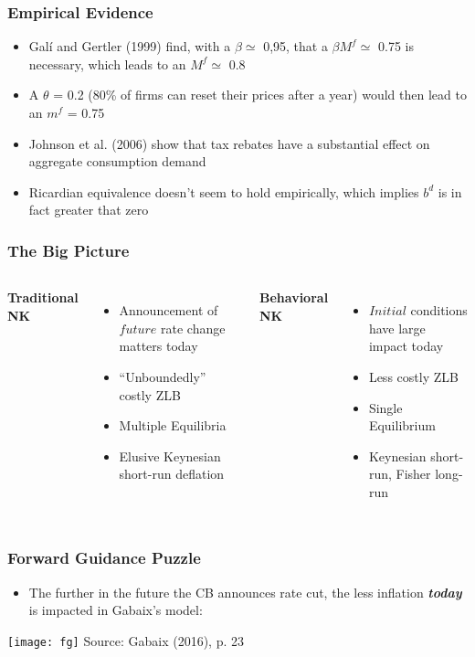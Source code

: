 \documentclass{beamer}
\begin{document}

\begin{frame}
\frametitle{Empirical Evidence}
\begin{itemize}
\item Gal\'{i} and Gertler (1999) find, with a $\beta \simeq$ 0,95, that a $\beta M^{f}\simeq$ 0.75 is necessary, which leads to an $M^{f}\simeq$ 0.8
\item A $\theta$ = 0.2 (80\% of firms can reset their prices after a year) would then lead to an ${m^{f}}$ = 0.75
\item Johnson et al. (2006) show that tax rebates have a substantial effect on aggregate consumption demand
\item Ricardian equivalence doesn't seem to hold empirically, which implies $b^{d}$ is in fact greater that zero  
\end{itemize}
\end{frame}


\begin{frame}
	\frametitle{The Big Picture}
	\begin{columns}[c] 
	\textbf{Traditional NK}
	\begin{itemize}
		\item Announcement of $future$ rate change matters today
		\item ``Unboundedly'' costly ZLB
		\item Multiple Equilibria
		\item Elusive Keynesian short-run deflation
	\end{itemize}

	\textbf{Behavioral NK}
	 \begin{itemize}
		\item $Initial$ conditions have large impact today
		\item Less costly ZLB
		\item Single Equilibrium
		\item Keynesian short-run, Fisher long-run
	\end{itemize}
	\end{columns}
\end{frame}


\begin{frame}
	\frametitle{Forward Guidance Puzzle}
	\begin{itemize}
		\item The further in the future the CB announces rate cut, the less inflation \textit{\textbf{today}} is impacted in Gabaix's model:
	\end{itemize}
	\texttt{[image: fg]}
	{\footnotesize Source: Gabaix (2016), p. 23}
\end{frame}
\end{document}
